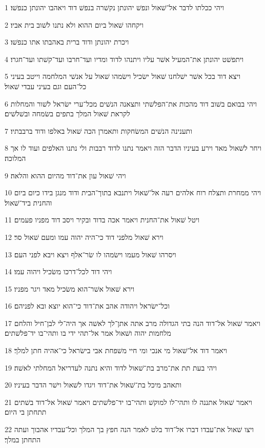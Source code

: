 \par 1 ויהי ככלתו לדבר אל־שׁאול ונפשׁ יהונתן נקשׁרה בנפשׁ דוד ויאהבו יהונתן כנפשׁו׃
\par 2 ויקחהו שׁאול ביום ההוא ולא נתנו לשׁוב בית אביו׃
\par 3 ויכרת יהונתן ודוד ברית באהבתו אתו כנפשׁו׃
\par 4 ויתפשׁט יהונתן את־המעיל אשׁר עליו ויתנהו לדוד ומדיו ועד־חרבו ועד־קשׁתו ועד־חגרו׃
\par 5 ויצא דוד בכל אשׁר ישׁלחנו שׁאול ישׂכיל וישׂמהו שׁאול על אנשׁי המלחמה וייטב בעיני כל־העם וגם בעיני עבדי שׁאול׃
\par 6 ויהי בבואם בשׁוב דוד מהכות את־הפלשׁתי ותצאנה הנשׁים מכל־ערי ישׂראל לשׁור והמחלות לקראת שׁאול המלך בתפים בשׂמחה ובשׁלשׁים׃
\par 7 ותענינה הנשׁים המשׂחקות ותאמרן הכה שׁאול באלפו ודוד ברבבתיו׃
\par 8 ויחר לשׁאול מאד וירע בעיניו הדבר הזה ויאמר נתנו לדוד רבבות ולי נתנו האלפים ועוד לו אך המלוכה׃
\par 9 ויהי שׁאול עון את־דוד מהיום ההוא והלאה׃
\par 10 ויהי ממחרת ותצלח רוח אלהים רעה אל־שׁאול ויתנבא בתוך־הבית ודוד מנגן בידו כיום ביום והחנית ביד־שׁאול׃
\par 11 ויטל שׁאול את־החנית ויאמר אכה בדוד ובקיר ויסב דוד מפניו פעמים׃
\par 12 וירא שׁאול מלפני דוד כי־היה יהוה עמו ומעם שׁאול סר׃
\par 13 ויסרהו שׁאול מעמו וישׂמהו לו שׂר־אלף ויצא ויבא לפני העם׃
\par 14 ויהי דוד לכל־דרכו משׂכיל ויהוה עמו׃
\par 15 וירא שׁאול אשׁר־הוא משׂכיל מאד ויגר מפניו׃
\par 16 וכל־ישׂראל ויהודה אהב את־דוד כי־הוא יוצא ובא לפניהם׃
\par 17 ויאמר שׁאול אל־דוד הנה בתי הגדולה מרב אתה אתן־לך לאשׁה אך היה־לי לבן־חיל והלחם מלחמות יהוה ושׁאול אמר אל־תהי ידי בו ותהי־בו יד־פלשׁתים׃
\par 18 ויאמר דוד אל־שׁאול מי אנכי ומי חיי משׁפחת אבי בישׂראל כי־אהיה חתן למלך׃
\par 19 ויהי בעת תת את־מרב בת־שׁאול לדוד והיא נתנה לעדריאל המחלתי לאשׁה׃
\par 20 ותאהב מיכל בת־שׁאול את־דוד ויגדו לשׁאול וישׁר הדבר בעיניו׃
\par 21 ויאמר שׁאול אתננה לו ותהי־לו למוקשׁ ותהי־בו יד־פלשׁתים ויאמר שׁאול אל־דוד בשׁתים תתחתן בי היום׃
\par 22 ויצו שׁאול את־עבדו דברו אל־דוד בלט לאמר הנה חפץ בך המלך וכל־עבדיו אהבוך ועתה התחתן במלך׃
